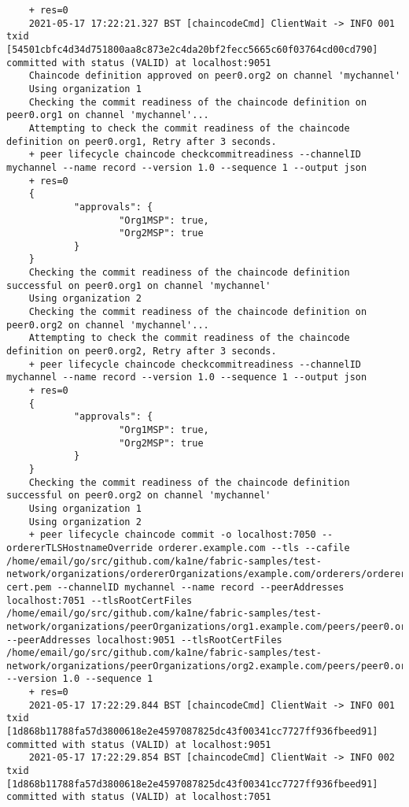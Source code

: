 \begin{lstlisting}
    + res=0
    2021-05-17 17:22:21.327 BST [chaincodeCmd] ClientWait -> INFO 001 txid [54501cbfc4d34d751800aa8c873e2c4da20bf2fecc5665c60f03764cd00cd790] committed with status (VALID) at localhost:9051
    Chaincode definition approved on peer0.org2 on channel 'mychannel'
    Using organization 1
    Checking the commit readiness of the chaincode definition on peer0.org1 on channel 'mychannel'...
    Attempting to check the commit readiness of the chaincode definition on peer0.org1, Retry after 3 seconds.
    + peer lifecycle chaincode checkcommitreadiness --channelID mychannel --name record --version 1.0 --sequence 1 --output json
    + res=0
    {
            "approvals": {
                    "Org1MSP": true,
                    "Org2MSP": true
            }
    }
    Checking the commit readiness of the chaincode definition successful on peer0.org1 on channel 'mychannel'
    Using organization 2
    Checking the commit readiness of the chaincode definition on peer0.org2 on channel 'mychannel'...
    Attempting to check the commit readiness of the chaincode definition on peer0.org2, Retry after 3 seconds.
    + peer lifecycle chaincode checkcommitreadiness --channelID mychannel --name record --version 1.0 --sequence 1 --output json
    + res=0
    {
            "approvals": {
                    "Org1MSP": true,
                    "Org2MSP": true
            }
    }
    Checking the commit readiness of the chaincode definition successful on peer0.org2 on channel 'mychannel'
    Using organization 1
    Using organization 2
    + peer lifecycle chaincode commit -o localhost:7050 --ordererTLSHostnameOverride orderer.example.com --tls --cafile /home/email/go/src/github.com/ka1ne/fabric-samples/test-network/organizations/ordererOrganizations/example.com/orderers/orderer.example.com/msp/tlscacerts/tlsca.example.com-cert.pem --channelID mychannel --name record --peerAddresses localhost:7051 --tlsRootCertFiles /home/email/go/src/github.com/ka1ne/fabric-samples/test-network/organizations/peerOrganizations/org1.example.com/peers/peer0.org1.example.com/tls/ca.crt --peerAddresses localhost:9051 --tlsRootCertFiles /home/email/go/src/github.com/ka1ne/fabric-samples/test-network/organizations/peerOrganizations/org2.example.com/peers/peer0.org2.example.com/tls/ca.crt --version 1.0 --sequence 1
    + res=0
    2021-05-17 17:22:29.844 BST [chaincodeCmd] ClientWait -> INFO 001 txid [1d868b11788fa57d3800618e2e4597087825dc43f00341cc7727ff936fbeed91] committed with status (VALID) at localhost:9051
    2021-05-17 17:22:29.854 BST [chaincodeCmd] ClientWait -> INFO 002 txid [1d868b11788fa57d3800618e2e4597087825dc43f00341cc7727ff936fbeed91] committed with status (VALID) at localhost:7051

\end{lstlisting}
